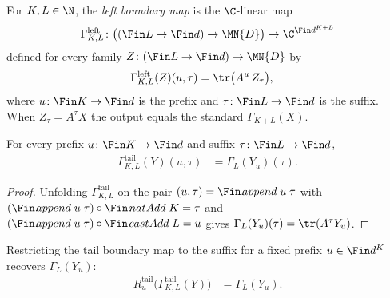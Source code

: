 \begin{definition}\label{def:left_boundary_map}
    \leanok
    For $K,L\in\N$, the \emph{left boundary map} is the $\C$-linear map
    \begin{align}
        \Gamma^{\mathrm{left}}_{K,L}\colon
        \bigl((\Fin L\to\Fin d)\to\MN{D}\bigr)
        \to\C^{\Fin d^{K+L}}
    \end{align}
    defined for every family $Z\colon(\Fin L\to\Fin d)\to\MN{D}$ by
    \begin{align}
        \Gamma^{\mathrm{left}}_{K,L}(Z)(u,\tau)
         & =\tr\bigl(A^{u}\,Z_{\tau}\bigr),
    \end{align}
    where $u\colon\Fin K\to\Fin d$ is the prefix and
    $\tau\colon\Fin L\to\Fin d$ is the suffix.
    When $Z_\tau=A^\tau X$ the output equals the standard $\Gamma_{K+L}(X)$.
\end{definition}

\begin{lemma}\label{thm:tail_boundary_map_append}
    \leanok
    For every prefix $u\colon\Fin K\to\Fin d$ and suffix $\tau\colon\Fin L\to\Fin d$,
    \begin{align}
        \Gamma^{\mathrm{tail}}_{K,L}(Y)(u,\tau)
         & =\Gamma_L(Y_u)(\tau).
    \end{align}
\end{lemma}

\begin{proof}
    \leanok
    Unfolding $\Gamma^{\mathrm{tail}}_{K,L}$ on the pair
    $(u,\tau)=\Fin.\!append\;u\;\tau$ with
    $(\Fin.\!append\;u\;\tau)\circ\Fin.\!natAdd\;K=\tau$ and
    $(\Fin.\!append\;u\;\tau)\circ\Fin.\!castAdd\;L=u$ gives
    $\Gamma_L(Y_u)(\tau)=\tr(A^\tau Y_u)$.
\end{proof}

\begin{lemma}\label{thm:tail_restrict_tail_boundary_map}
    \leanok
    Restricting the tail boundary map to the suffix for a fixed prefix
    $u\in\Fin d^K$ recovers $\Gamma_L(Y_u)$:
    \begin{align}
        R^{\mathrm{tail}}_u\bigl(\Gamma^{\mathrm{tail}}_{K,L}(Y)\bigr)
         & =\Gamma_L(Y_u).
    \end{align}
\end{lemma}

